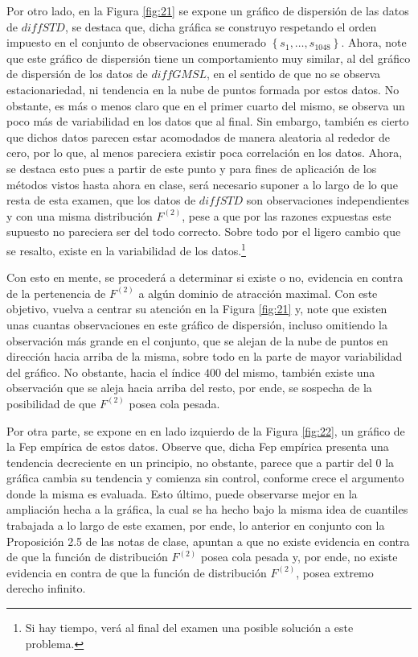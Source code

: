 \documentclass[10.5pt,notitlepage]{article}
\newcommand{\kis}[1]{\left\{ #1 \right\}}
\theoremstyle{plain}
\begin{document}
 Por otro lado, en la Figura \ref{fig:21} se expone un gráfico de dispersión de las datos de \(diffSTD\), se destaca que, dicha gráfica se construyo respetando el orden impuesto en el conjunto de observaciones enumerado \(\kis{s_1, \hdots, s_{1048}}\). Ahora, note que este gráfico de dispersión tiene un comportamiento muy similar, al del gráfico de dispersión de los datos de \(diffGMSL\), en el sentido de que no se observa estacionariedad, ni tendencia en la nube de puntos formada por estos datos. No obstante, es más o menos claro que en el primer cuarto del mismo, se observa un poco más de variabilidad en los datos que al final. Sin embargo, también es cierto que dichos datos parecen estar acomodados de manera aleatoria al rededor de cero, por lo que, al menos pareciera existir poca correlación en los datos. Ahora, se destaca esto pues a partir de este punto y para fines de aplicación de los métodos vistos hasta ahora en clase, será necesario suponer a lo largo de lo que resta de esta examen, que los datos de \(diffSTD\) son observaciones independientes y con una misma distribución \(F^{(2)}\), pese a que por las razones expuestas este supuesto no pareciera ser del todo correcto. Sobre todo por el ligero cambio que se resalto, existe en la variabilidad de los datos.\footnote{Si hay tiempo, verá al final del examen una posible solución a este problema.}  
 

Con esto en mente, se procederá a determinar si existe o no, evidencia en contra de la pertenencia de \(F^{(2)}\) a algún dominio de atracción maximal. Con este objetivo, vuelva a centrar su atención en la Figura \ref{fig:21} y, note que existen unas cuantas observaciones en este gráfico de dispersión, incluso omitiendo la observación más grande en el conjunto, que se alejan de la nube de puntos en dirección hacia arriba de la misma, sobre todo en la parte de mayor variabilidad del gráfico. No obstante, hacia el índice \(400\) del mismo, también existe una observación que se aleja hacia arriba del resto, por ende, se sospecha de la posibilidad de que \(F^{(2)}\) posea cola pesada.
 
Por otra parte, se expone en en lado izquierdo de la Figura \ref{fig:22}, un gráfico de la Fep empírica de estos datos. Observe que, dicha Fep empírica presenta una tendencia decreciente en un principio, no obstante, parece que a partir del \(0\) la gráfica cambia su tendencia y comienza sin control, conforme crece el argumento donde la misma es evaluada. Esto último, puede observarse mejor en la ampliación hecha a la gráfica, la cual se ha hecho bajo la misma idea de cuantiles trabajada a lo largo de este examen, por ende, lo anterior en conjunto con la Proposición 2.5 de las notas de clase, apuntan a que no existe evidencia en contra de que la función de distribución \(F^{(2)}\) posea cola pesada y, por ende, no existe evidencia en contra de que la función de distribución \(F^{(2)}\), posea extremo derecho infinito. 
\end{document}
